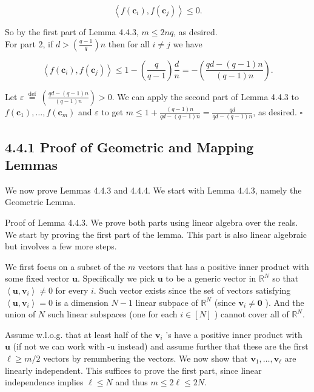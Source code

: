 \documentclass[10pt]{article}
\begin{document}
$$
\left\langle f\left(\mathbf{c}_{i}\right), f\left(\mathbf{c}_{j}\right)\right\rangle \leq 0 .
$$

So by the first part of Lemma 4.4.3, $m \leq 2 n q$, as desired.\\
For part 2, if $d>\left(\frac{q-1}{q}\right) n$ then for all $i \neq j$ we have

$$
\left\langle f\left(\mathbf{c}_{i}\right), f\left(\mathbf{c}_{j}\right)\right\rangle \leq 1-\left(\frac{q}{q-1}\right) \frac{d}{n}=-\left(\frac{q d-(q-1) n}{(q-1) n}\right) .
$$

Let $\varepsilon \stackrel{\text { def }}{=}\left(\frac{q d-(q-1) n}{(q-1) n}\right)>0$. We can apply the second part of Lemma 4.4.3 to $f\left(\mathbf{c}_{1}\right), \ldots, f\left(\mathbf{c}_{m}\right)$ and $\varepsilon$ to get $m \leq 1+\frac{(q-1) n}{q d-(q-1) n}=\frac{q d}{q d-(q-1) n}$, as desired. \(\square\)

\subsection*{4.4.1 Proof of Geometric and Mapping Lemmas}
We now prove Lemmas 4.4.3 and 4.4.4. We start with Lemma 4.4.3, namely the Geometric Lemma.

Proof of Lemma 4.4.3. We prove both parts using linear algebra over the reals.\\
We start by proving the first part of the lemma. This part is also linear algebraic but involves a few more steps.

We first focus on a subset of the $m$ vectors that has a positive inner product with some fixed vector $\mathbf{u}$. Specifically we pick $\mathbf{u}$ to be a generic vector in $\mathbb{R}^{N}$ so that $\left\langle\mathbf{u}, \mathbf{v}_{i}\right\rangle \neq 0$ for every $i$. Such vector exists since the set of vectors satisfying $\left\langle\mathbf{u}, \mathbf{v}_{i}\right\rangle=0$ is a dimension $N-1$ linear subpace of $\mathbb{R}^{N}$ (since $\mathbf{v}_{i} \neq \mathbf{0}$ ). And the union of $N$ such linear subspaces (one for each $i \in[N]$ ) cannot cover all of $\mathbb{R}^{N}$.

Assume w.l.o.g. that at least half of the $\mathbf{v}_{i}$ 's have a positive inner product with $\mathbf{u}$ (if not we can work with -u instead) and assume further that these are the first $\ell \geq m / 2$ vectors by renumbering the vectors. We now show that $\mathbf{v}_{1}, \ldots, \mathbf{v}_{\ell}$ are linearly independent. This suffices to prove the first part, since linear independence implies $\ell \leq N$ and thus $m \leq 2 \ell \leq 2 N$.
\end{document}
